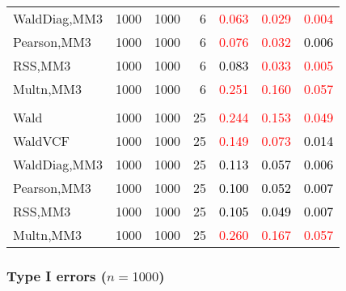 \documentclass[
]{article}
\begin{document}
\begin{table}[H]
{\begin{tabular}[t]{lrrrrrr}
\hspace{1em}WaldDiag,MM3 & 1000 & 1000 & 6 & \textcolor{red}{0.063} & \textcolor{red}{0.029} & \textcolor{red}{0.004}\\
\hspace{1em}Pearson,MM3 & 1000 & 1000 & 6 & \textcolor{red}{0.076} & \textcolor{red}{0.032} & \textcolor{black}{0.006}\\
\hspace{1em}RSS,MM3 & 1000 & 1000 & 6 & \textcolor{black}{0.083} & \textcolor{red}{0.033} & \textcolor{red}{0.005}\\
\hspace{1em}Multn,MM3 & 1000 & 1000 & 6 & \textcolor{red}{0.251} & \textcolor{red}{0.160} & \textcolor{red}{0.057}\\
\addlinespace[0.3em]
\multicolumn{7}{l}{\textbf{3F 15V}}\\
\hspace{1em}Wald & 1000 & 1000 & 25 & \textcolor{red}{0.244} & \textcolor{red}{0.153} & \textcolor{red}{0.049}\\
\hspace{1em}WaldVCF & 1000 & 1000 & 25 & \textcolor{red}{0.149} & \textcolor{red}{0.073} & \textcolor{black}{0.014}\\
\hspace{1em}WaldDiag,MM3 & 1000 & 1000 & 25 & \textcolor{black}{0.113} & \textcolor{black}{0.057} & \textcolor{black}{0.006}\\
\hspace{1em}Pearson,MM3 & 1000 & 1000 & 25 & \textcolor{black}{0.100} & \textcolor{black}{0.052} & \textcolor{black}{0.007}\\
\hspace{1em}RSS,MM3 & 1000 & 1000 & 25 & \textcolor{black}{0.105} & \textcolor{black}{0.049} & \textcolor{black}{0.007}\\
\hspace{1em}Multn,MM3 & 1000 & 1000 & 25 & \textcolor{red}{0.260} & \textcolor{red}{0.167} & \textcolor{red}{0.057}\\
\bottomrule
\end{tabular}}
\endgroup{}
\end{table}

\hypertarget{type-i-errors-n1000-2}{%
\subsubsection{\texorpdfstring{Type I errors
(\(n=1000\))}{Type I errors (n=1000)}}\label{type-i-errors-n1000-2}}
\end{document}
